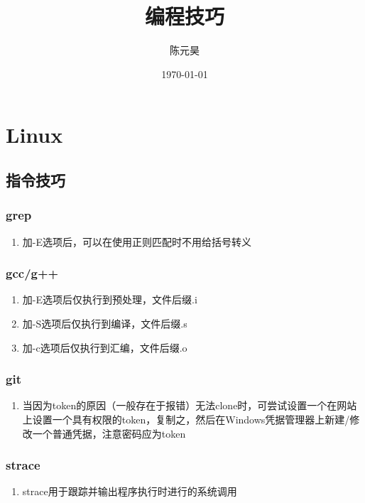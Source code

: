 \documentclass[onecolumn]{article}
\title{编程技巧}
\author{陈元昊}
\date{\today}
\begin{document}
\maketitle
\renewcommand{\contentsname}{目录}
\tableofcontents
\section{Linux}
    \subsection{指令技巧}
        \subsubsection{grep}
            \noindent
            \begin{enumerate}
                \item 加-E选项后，可以在使用正则匹配时不用给括号转义
            \end{enumerate}
        \subsubsection{gcc/g++}
            \noindent
            \begin{enumerate}
                \item 加-E选项后仅执行到预处理，文件后缀.i
                \item 加-S选项后仅执行到编译，文件后缀.s
                \item 加-c选项后仅执行到汇编，文件后缀.o
            \end{enumerate}
        \subsubsection{git}
            \noindent
            \begin{enumerate}
                \item 当因为token的原因（一般存在于报错）无法clone时，可尝试设置一个在网站上设置一个具有权限的token，复制之，然后在Windows凭据管理器上新建/修改一个普通凭据，注意密码应为token
            \end{enumerate}
        \subsubsection{strace}
            \noindent
            \begin{enumerate}
                \item strace用于跟踪并输出程序执行时进行的系统调用
            \end{enumerate}
\end{document}
